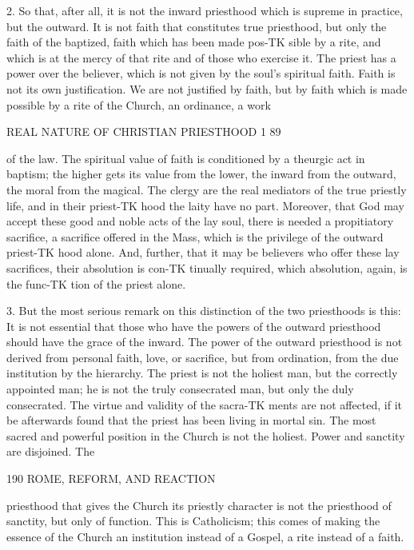 \documentclass[12pt,a5paper,twoside]{book}
\begin{document}
{2. So that, after all, it is not the inward priesthood 
which is supreme in practice, but the outward. It is 
not faith that constitutes true priesthood, but only the 
faith of the baptized, faith which has been made pos-TK
sible by a rite, and which is at the mercy of that rite 
and of those who exercise it. The priest has a power 
over the believer, which is not given by the soul's 
spiritual faith. Faith is not its own justification. We 
are not justified by faith, but by faith which is made 
possible by a rite of the Church, an ordinance, a work 



REAL NATURE OF CHRISTIAN PRIESTHOOD 1 89 

of the law. The spiritual value of faith is conditioned 
by a theurgic act in baptism; the higher gets its 
value from the lower, the inward from the outward, 
the moral from the magical. The clergy are the real 
mediators of the true priestly life, and in their priest-TK
hood the laity have no part. Moreover, that God may 
accept these good and noble acts of the lay soul, there 
is needed a propitiatory sacrifice, a sacrifice offered in 
the Mass, which is the privilege of the outward priest-TK
hood alone. And, further, that it may be believers 
who offer these lay sacrifices, their absolution is con-TK
tinually required, which absolution, again, is the func-TK
tion of the priest alone. 

3. But the most serious remark on this distinction 
of the two priesthoods is this: It is not essential that 
those who have the powers of the outward priesthood 
should have the grace of the inward. The power of 
the outward priesthood is not derived from personal 
faith, love, or sacrifice, but from ordination, from the 
due institution by the hierarchy. The priest is not 
the holiest man, but the correctly appointed man; he 
is not the truly consecrated man, but only the duly 
consecrated. The virtue and validity of the sacra-TK
ments are not affected, if it be afterwards found that 
the priest has been living in mortal sin. The most 
sacred and powerful position in the Church is not the 
holiest. Power and sanctity are disjoined. The 



190 ROME, REFORM, AND REACTION 

priesthood that gives the Church its priestly character 
is not the priesthood of sanctity, but only of function. 
This is Catholicism; this comes of making the 
essence of the Church an institution instead of a 
Gospel, a rite instead of a faith. 

}
\end{document}
